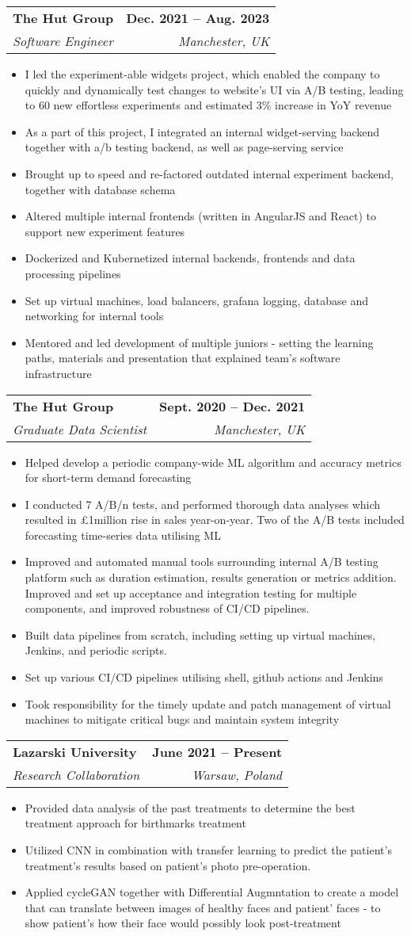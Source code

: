 \documentclass[letterpaper,11pt]{article}
\makeatletter
\newcommand{\resumeItem}[1]{
  \item\small{
    {#1 \vspace{-2pt}}
  }
}
\newcommand{\resumeSubheading}[4]{
  \vspace{-2pt}\item
    \begin{tabular*}{1.0\textwidth}[t]{l@{\extracolsep{\fill}}r}
      \textbf{#1} & \textbf{\small #2} \\
      \textit{\small#3} & \textit{\small #4} \\
    \end{tabular*}\vspace{-7pt}
}
\newcommand{\resumeItemListStart}{\begin{itemize}}
\newcommand{\resumeItemListEnd}{\end{itemize}\vspace{-5pt}}
\makeatother
\begin{document}
    \resumeSubheading
      {The Hut Group}{Dec. 2021 -- Aug. 2023}
      {Software Engineer}{Manchester, UK}
      \resumeItemListStart
        \resumeItem{I led the experiment-able widgets project, which enabled the company to quickly and dynamically test changes to website's UI via A/B testing, leading to 60 new effortless experiments and estimated 3\% increase in YoY revenue}
        \resumeItem{As a part of this project, I integrated an internal widget-serving backend together with a/b testing backend, as well as page-serving service}
        \resumeItem{Brought up to speed and re-factored outdated internal experiment backend, together with database schema}
        \resumeItem{Altered multiple internal frontends (written in AngularJS and React) to support new experiment features}
        \resumeItem{Dockerized and Kubernetized internal backends, frontends and data processing pipelines}
        \resumeItem{Set up virtual machines, load balancers, grafana logging, database and networking for internal tools}
        \resumeItem{Mentored and led development of multiple juniors - setting the learning paths, materials and presentation that explained team's software infrastructure}
      \resumeItemListEnd

    \resumeSubheading
      {The Hut Group}{Sept. 2020 -- Dec. 2021}
      {Graduate Data Scientist}{Manchester, UK}
      \resumeItemListStart
        \resumeItem{Helped develop a periodic company-wide ML algorithm and accuracy metrics for short-term demand forecasting}
        \resumeItem{I conducted 7 A/B/n tests, and performed thorough data analyses which resulted in £1million rise in sales year-on-year. Two of the A/B tests included forecasting time-series data utilising ML}
        \resumeItem{Improved and automated manual tools surrounding internal A/B testing platform such as duration estimation, results generation or metrics addition. Improved and set up acceptance and integration testing for multiple components, and improved robustness of CI/CD pipelines.}
        \resumeItem{Built data pipelines from scratch, including setting up virtual machines, Jenkins, and periodic scripts.}
        \resumeItem{Set up various CI/CD pipelines utilising shell, github actions and Jenkins}   
        \resumeItem{Took responsibility for the timely update and patch management of virtual machines to mitigate critical bugs and maintain system integrity}
      \resumeItemListEnd


      \resumeSubheading
      {Lazarski University}{June 2021 -- Present}
      {Research Collaboration}{Warsaw, Poland}
      \resumeItemListStart
        \resumeItem{Provided data analysis of the past treatments to determine the best treatment approach for birthmarks treatment}
        \resumeItem{Utilized CNN in combination with transfer learning to predict the patient's treatment's results based on patient's photo pre-operation.}
        \resumeItem{Applied cycleGAN together with Differential Augmntation to create a model that can translate between images of healthy faces and patient' faces - to show patient's how their face would possibly look post-treatment}
      \resumeItemListEnd
\end{document}
